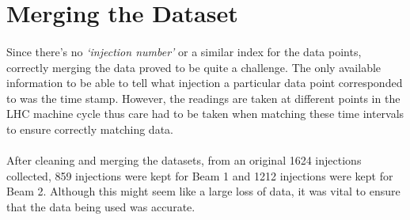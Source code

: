 \section{Merging the Dataset}
\label{sec::Merging_the_Dataset}
\paragraph{ }Since there's no \textit{`injection number'} or a similar index for the data points, correctly merging the data proved to be quite a challenge. The only available information to be able to tell what injection a particular data point corresponded to was the time stamp. However, the readings are taken at different points in the \acs{LHC} machine cycle thus care had to be taken when matching these time intervals to ensure correctly matching data.  

\paragraph{ }After cleaning and merging the datasets, from an original 1624 injections collected, 859 injections were kept for Beam 1 and 1212 injections were kept for Beam 2. Although this might seem like a large loss of data, it was vital to ensure that the data being used was accurate.